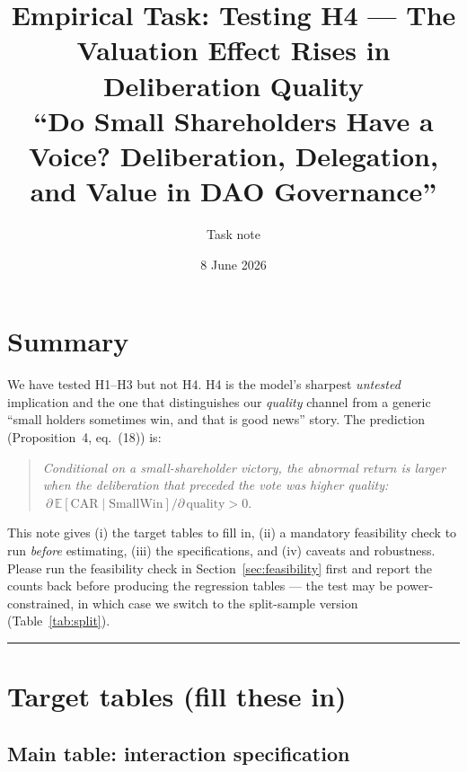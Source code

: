\documentclass[11pt]{article}
\title{Empirical Task: Testing H4 --- The Valuation Effect Rises in Deliberation Quality\\
\large ``Do Small Shareholders Have a Voice? Deliberation, Delegation, and Value in DAO Governance''}
\author{Task note }
\date{8 June 2026}
\newcommand{\E}{\mathbb{E}}
\newcommand{\SmallWin}{\mathrm{SmallWin}}
\begin{document}
\maketitle

\section*{Summary}

We have tested H1--H3 but not H4. H4 is the model's sharpest \emph{untested}
implication and the one that distinguishes our \emph{quality} channel from a generic
``small holders sometimes win, and that is good news'' story. The prediction
(Proposition~4, eq.~(18)) is:
\begin{quote}
\emph{Conditional on a small-shareholder victory, the abnormal return is larger when
the deliberation that preceded the vote was higher quality:}
$\ \partial\,\E[\mathrm{CAR}\mid \SmallWin]/\partial\,\mathrm{quality} > 0.$
\end{quote}

This note gives (i) the target tables to fill in, (ii) a mandatory feasibility check to
run \emph{before} estimating, (iii) the specifications, and (iv) caveats and robustness.
Please run the feasibility check in Section~\ref{sec:feasibility} first and report the
counts back before producing the regression tables --- the test may be power-constrained,
in which case we switch to the split-sample version (Table~\ref{tab:split}).

\bigskip
\hrule
\section{Target tables (fill these in)}

\subsection{Main table: interaction specification}
\end{document}
